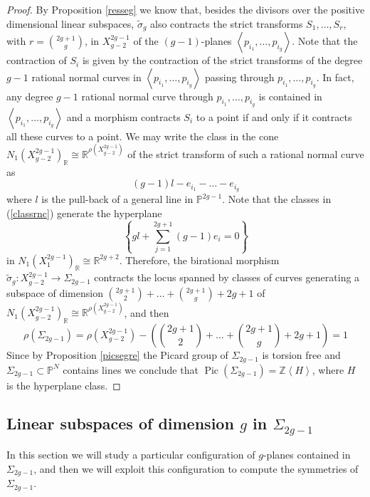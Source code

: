 \documentclass[a4paper,10pt]{amsart}
\theoremstyle{definition}
\DeclareMathOperator{\Pic}{Pic}
\begin{document}
\begin{proof}
By Proposition \ref{resseg} we know that, besides the divisors over the positive dimensional linear subspaces, $\widetilde{\sigma}_g$ also contracts the strict transforms $S_1,\dots,S_r$, with $r = \binom{2g+1}{g}$, in $X^{2g-1}_{g-2}$ of the $(g-1)$-planes $\left\langle p_{i_1},\dots,p_{i_g}\right\rangle$. Note that the contraction of $S_i$ is given by the contraction of the strict transforms of the degree $g-1$ rational normal curves in $\left\langle p_{i_1},\dots,p_{i_g}\right\rangle$ passing through $p_{i_1},\dots,p_{i_g}$. In fact, any degree $g-1$ rational normal curve through $p_{i_1},\dots,p_{i_g}$ is contained in $\left\langle p_{i_1},\dots,p_{i_g}\right\rangle$ and a morphism contracts $S_i$ to a point if and only if it contracts all these curves to a point. We may write the class in the cone $N_1(X^{2g-1}_{g-2})_{\mathbb{R}}\cong \mathbb{R}^{\rho(X^{2g-1}_{g-2})}$ of the strict transform of such a rational normal curve as
\begin{equation}\label{classrnc}
(g-1)l-e_{i_1}-\dots-e_{i_g} 
\end{equation}
where $l$ is the pull-back of a general line in $\mathbb{P}^{2g-1}$. Note that the classes in (\ref{classrnc}) generate the hyperplane
$$\left\lbrace gl+\sum_{j=1}^{2g+1}(g-1)e_i = 0\right\rbrace$$
in $N_1(X^{2g-1}_{1})_{\mathbb{R}}\cong \mathbb{R}^{2g+2}$. Therefore, the birational morphism $\widetilde{\sigma}_g: X^{2g-1}_{g-2}\rightarrow \Sigma_{2g-1}$ contracts the locus spanned by classes of curves generating a subspace of dimension $\binom{2g+1}{2}+\dots+\binom{2g+1}{g} + 2g+1$ of $N_1(X^{2g-1}_{g-2})_{\mathbb{R}}\cong \mathbb{R}^{\rho(X^{2g-1}_{g-2})}$, and then 
$$\rho(\Sigma_{2g-1}) = \rho(X^{2g-1}_{g-2})-\left(\binom{2g+1}{2}+\dots+\binom{2g+1}{g} + 2g+1\right) = 1$$
Since by Proposition \ref{picsegre} the Picard group of $\Sigma_{2g-1}$ is torsion free and $\Sigma_{2g-1}\subset\mathbb{P}^N$ contains lines we conclude that $\Pic(\Sigma_{2g-1})=\mathbb{Z}\left\langle H\right\rangle$, where $H$ is the hyperplane class.
\end{proof}

\subsection{Linear subspaces of dimension $g$ in $\Sigma_{2g-1}$}\label{gSeg}
In this section we will study a particular configuration of $g$-planes contained in $\Sigma_{2g-1}$, and then we will exploit this configuration to compute the symmetries of $\Sigma_{2g-1}$.
\end{document}
